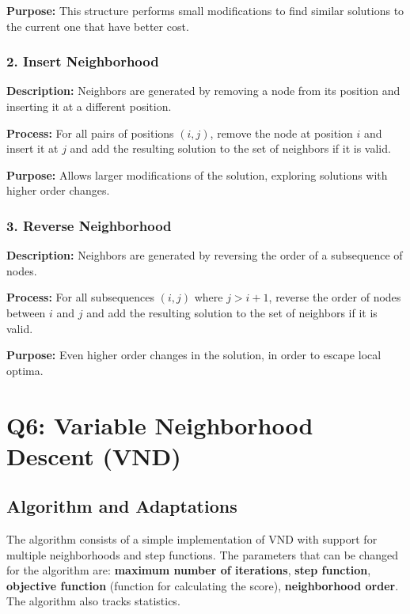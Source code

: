 \documentclass{article}
\begin{document}
\noindent \textbf{Purpose:} This structure performs small modifications to find similar solutions to the current one that have better cost.

\subsubsection*{2. Insert Neighborhood}
\textbf{Description:} Neighbors are generated by removing a node from its position and inserting it at a different position.

\noindent \textbf{Process:} For all pairs of positions \( (i, j) \), remove the node at position \( i \) and insert it at \( j \) and add the resulting solution to the set of neighbors if it is valid.

\noindent \textbf{Purpose:} Allows larger modifications of the solution, exploring solutions with higher order changes.

\subsubsection*{3. Reverse Neighborhood}
\textbf{Description:} Neighbors are generated by reversing the order of a subsequence of nodes.

\noindent \textbf{Process:} For all subsequences \( (i, j) \) where \( j > i + 1 \), reverse the order of nodes between \( i \) and \( j \) and add the resulting solution to the set of neighbors if it is valid.

\noindent \textbf{Purpose:} Even higher order changes in the solution, in order to escape local optima.


\section*{Q6: Variable Neighborhood Descent (VND)}
\subsection*{Algorithm and Adaptations}
The algorithm consists of a simple implementation of VND with support for multiple neighborhoods and step functions. The parameters that can be changed for the algorithm are: \textbf{maximum number of iterations}, \textbf{step function}, \textbf{objective function} (function for calculating the score), \textbf{neighborhood order}. The algorithm also tracks statistics.
\end{document}
